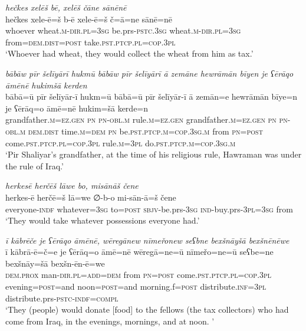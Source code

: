\ea \label{BP.15}
\textit{hečkes xelēš bē, xelēš čāne sānēnē} \\ 
\gll hečkes xele-ē=š b-ē xele-ē=š č=ā=ne sānē=nē \\ 
 whoever wheat\textsc{.m}\textsc{-dir}\textsc{.pl}\textsc{=3sg} be.prs\textsc{-pstc}\textsc{.3sg} wheat\textsc{.m}\textsc{-dir}\textsc{.pl}\textsc{=3sg} from=\textsc{dem.dist}\textsc{=\textsc{post}} take\textsc{.pst}\textsc{.ptcp}\textsc{.pl}\textsc{=cop}\textsc{.3pl} \\ 
\glt `Whoever had wheat, they would collect the wheat from him as tax.'
\z 
 
\ea \label{BP.21}
\textit{bābāw pīr šelīyārī hukmū bābāw pīr šelīyārī ā zemāne hewrāmān bīyen je ʕērāqo āmēnē hukimšā kerden} \\ 
\gll bābā=ū pīr šelīyār-ī hukm=ū bābā=ū pīr šelīyār-ī ā zemān=e hewrāmān bīye=n je ʕērāq=o āmē=nē hukim=šā kerde=n \\ 
 grandfather\textsc{.m}\textsc{=ez.gen} \textsc{pn} \textsc{pn}\textsc{-obl}\textsc{.m} rule\textsc{.m}\textsc{=ez.gen} grandfather\textsc{.m}\textsc{=ez.gen} \textsc{pn} \textsc{pn}\textsc{-obl}\textsc{.m} \textsc{dem.dist} time\textsc{.m}\textsc{=dem} \textsc{pn} be\textsc{.pst}\textsc{.ptcp}\textsc{.m}\textsc{=cop}\textsc{.3sg}\textsc{.m} from \textsc{pn}\textsc{=\textsc{post}} come\textsc{.pst}\textsc{.ptcp}\textsc{.pl}\textsc{=cop}\textsc{.3pl} rule\textsc{.m}\textsc{=3pl} do\textsc{.pst}\textsc{.ptcp}\textsc{.m}\textsc{=cop}\textsc{.3sg}\textsc{.m} \\ 
\glt `Pir Shaliyar’s grandfather, at the time of his religious rule, Hawraman was under the rule of Iraq.'
\z 
 
\ea \label{BP.30}
\textit{herkesē herčēš lāwe bo, misānāš čene} \\ 
\gll herkes-ē herčē=š lā=we ∅-b-o mi-sān-ā=š čene \\ 
 everyone\textsc{-indf} whatever\textsc{=3sg} to\textsc{=\textsc{post}} \textsc{sbjv-}be.prs\textsc{-3sg} \textsc{ind-}buy.prs\textsc{-3pl}\textsc{=3sg} from \\ 
\glt `They would take whatever possessions everyone had.'
\z 
 
\ea \label{BP.38}
\textit{ī kābrēče je ʕērāqo āmēnē, wēregānew nīmeřonew seʕbne bexšnāyšā bexšnēnēwe} \\ 
\gll ī kābrā-ē=č=e je ʕērāq=o āmē=nē wēregā=ne=ū nīmeřo=ne=ū seʕbe=ne bexšnāy=šā bexšn-ēn-ē=we \\ 
 \textsc{dem.prox} man\textsc{-dir}\textsc{.pl}\textsc{=add}\textsc{=dem} from \textsc{pn}\textsc{=\textsc{post}} come\textsc{.pst}\textsc{.ptcp}\textsc{.pl}\textsc{=cop}\textsc{.3pl} evening\textsc{=\textsc{post}}=and noon\textsc{=\textsc{post}}=and morning.f\textsc{=\textsc{post}} distribute\textsc{.inf}\textsc{=3pl} distribute.prs\textsc{-pstc}\textsc{-indf}\textsc{=compl} \\ 
\glt `They (people) would donate [food] to the fellows (the tax collectors) who had come from Iraq, in the evenings, mornings, and at noon. '
\z 
 
